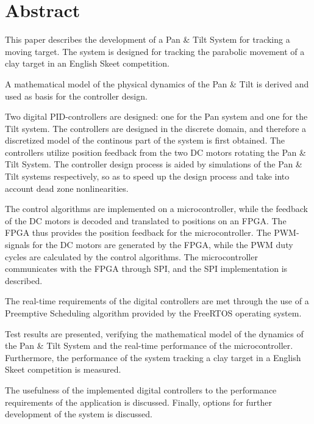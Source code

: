 
\setcounter{page}{1}
\section*{Abstract}
This paper describes the development of a Pan \& Tilt System for tracking a moving
target. The system is designed for tracking the parabolic movement of
a clay target in an English Skeet competition.

A mathematical model of the physical dynamics of the Pan \& Tilt is
derived and used as basis for the controller design.

Two digital PID-controllers are designed: one for the Pan system and one for the Tilt system.
The controllers are designed in the discrete domain, and therefore a discretized model
of the continous part of the system is first obtained.
The controllers utilize position feedback from 
the two DC motors
rotating the Pan \& Tilt System.
The controller design process is aided by simulations of the Pan \& Tilt systems respectively,
so as to speed up the design process and take into account dead zone nonlinearities.

The control algorithms are implemented on a microcontroller, while
the feedback of the DC motors is decoded and translated to positions on an FPGA.
The FPGA thus provides the position feedback for the microcontroller.
The PWM-signals for the DC motors are generated by the FPGA, while the PWM duty cycles are calculated by the control algorithms.
The microcontroller communicates with the FPGA through SPI, and the SPI implementation is described.

The real-time requirements of the digital controllers are met through the use
of a Preemptive Scheduling algorithm provided by the FreeRTOS operating
system.

Test results are presented,
verifying the mathematical model of the dynamics of the Pan \& Tilt System
and the real-time performance of the microcontroller.
Furthermore, the performance of the system tracking a clay target in a English Skeet competition is measured.

The usefulness of the implemented digital controllers to the performance requirements
of the application is discussed. Finally, options for further development of the system is discussed. 

